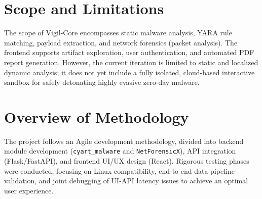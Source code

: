 \section{Scope and Limitations}
The scope of Vigil-Core encompasses static malware analysis, YARA rule matching, payload extraction, and network forensics (packet analysis). The frontend supports artifact exploration, user authentication, and automated PDF report generation. However, the current iteration is limited to static and localized dynamic analysis; it does not yet include a fully isolated, cloud-based interactive sandbox for safely detonating highly evasive zero-day malware.

\section{Overview of Methodology}
The project follows an Agile development methodology, divided into backend module development (\texttt{cyart\_malware} and \texttt{NetForensicX}), API integration (Flask/FastAPI), and frontend UI/UX design (React). Rigorous testing phases were conducted, focusing on Linux compatibility, end-to-end data pipeline validation, and joint debugging of UI-API latency issues to achieve an optimal user experience.
